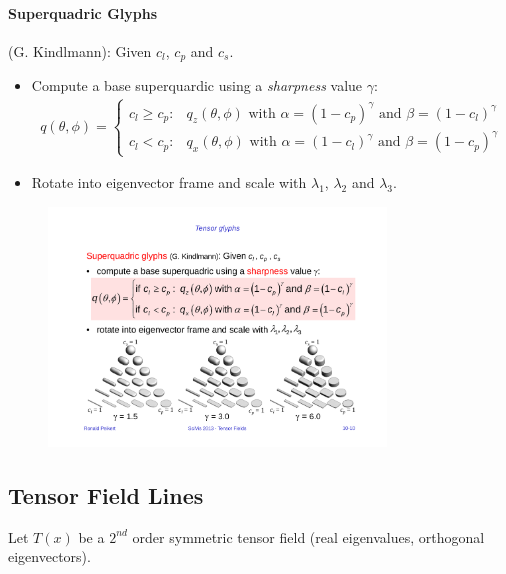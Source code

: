 \paragraph{Superquadric Glyphs} (G. Kindlmann): Given $c_l$, $c_p$ and $c_s$.
\begin{itemize}
    \item Compute a base superquardic using a \emph{sharpness} value $\gamma$:
        \begin{align*}
            q(\theta, \phi) = 
                \begin{cases}
                     c_l \geq c_p: & q_z (\theta, \phi)  \text{ with $\alpha = (1-c_p)^\gamma$  and $\beta = (1-c_l)^\gamma$}\\
                     c_l < c_p:    & q_x (\theta, \phi)  \text{ with $\alpha = (1-c_l)^\gamma$  and $\beta = (1-c_p)^\gamma$}
                \end{cases}
        \end{align*}
    \item Rotate into eigenvector frame and scale with $\lambda_1$, $\lambda_2$ and $\lambda_3$.
\end{itemize}
\begin{figure}[H]
\centering
\includegraphics[width=0.8\textwidth]{img/10_superquadrics}
\end{figure}

\subsection{Tensor Field Lines}
Let $T(x)$ be a $2^{nd}$ order symmetric tensor field (real eigenvalues, orthogonal eigenvectors).

